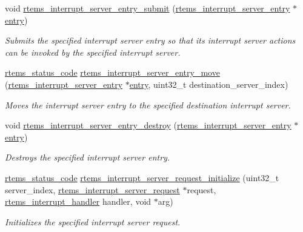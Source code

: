 \begin{DoxyCompactItemize}
void \mbox{\hyperlink{group__rtems__interrupt__extension_ga9fd697f72b1ab860a3ebb548fab5929f}{rtems\+\_\+interrupt\+\_\+server\+\_\+entry\+\_\+submit}} (\mbox{\hyperlink{structrtems__interrupt__server__entry}{rtems\+\_\+interrupt\+\_\+server\+\_\+entry}} $\ast$\mbox{\hyperlink{structentry}{entry}})
\begin{DoxyCompactList}\small\item\em Submits the specified interrupt server entry so that its interrupt server actions can be invoked by the specified interrupt server. \end{DoxyCompactList}\item 
\mbox{\hyperlink{group__ClassicStatus_ga545d41846817eaba6143d52ee4d9e9fe}{rtems\+\_\+status\+\_\+code}} \mbox{\hyperlink{group__rtems__interrupt__extension_gaa7023165766039522b7d4572f6335c3e}{rtems\+\_\+interrupt\+\_\+server\+\_\+entry\+\_\+move}} (\mbox{\hyperlink{structrtems__interrupt__server__entry}{rtems\+\_\+interrupt\+\_\+server\+\_\+entry}} $\ast$\mbox{\hyperlink{structentry}{entry}}, uint32\+\_\+t destination\+\_\+server\+\_\+index)
\begin{DoxyCompactList}\small\item\em Moves the interrupt server entry to the specified destination interrupt server. \end{DoxyCompactList}\item 
void \mbox{\hyperlink{group__rtems__interrupt__extension_ga8926167fe72ef23335bd242b0380c038}{rtems\+\_\+interrupt\+\_\+server\+\_\+entry\+\_\+destroy}} (\mbox{\hyperlink{structrtems__interrupt__server__entry}{rtems\+\_\+interrupt\+\_\+server\+\_\+entry}} $\ast$\mbox{\hyperlink{structentry}{entry}})
\begin{DoxyCompactList}\small\item\em Destroys the specified interrupt server entry. \end{DoxyCompactList}\item 
\mbox{\hyperlink{group__ClassicStatus_ga545d41846817eaba6143d52ee4d9e9fe}{rtems\+\_\+status\+\_\+code}} \mbox{\hyperlink{group__rtems__interrupt__extension_ga6cd3744454ee6cbaf6aa77ba3e6d956d}{rtems\+\_\+interrupt\+\_\+server\+\_\+request\+\_\+initialize}} (uint32\+\_\+t server\+\_\+index, \mbox{\hyperlink{structrtems__interrupt__server__request}{rtems\+\_\+interrupt\+\_\+server\+\_\+request}} $\ast$request, \mbox{\hyperlink{group__rtems__interrupt__extension_gab39bd096ab2c3b41d03dace0e9777b08}{rtems\+\_\+interrupt\+\_\+handler}} handler, void $\ast$arg)
\begin{DoxyCompactList}\small\item\em Initializes the specified interrupt server request. \end{DoxyCompactList}\item 

\end{DoxyCompactItemize}
